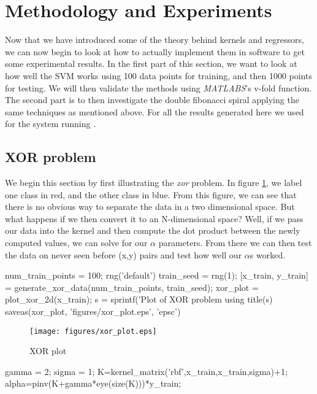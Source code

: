 \documentclass[11pt, twoside]{article}   	%
\newenvironment{matlab}{\comment}{\endcomment}
\begin{document}
\section{Methodology and Experiments}
Now that we have introduced some of the theory behind kernels and regressors, we can now begin to look at how to 
actually implement them in software to get some experimental results. 
In the first part of this section, we want to look at how well the SVM works using
100 data points for training, and then 1000 points for testing. We will
then validate the methods using \textit{MATLABS}'s v-fold function. The
second part is to then investigate the double fibonacci spiral applying
the same techniques as mentioned above. For all the results generated here
we used  for the system running
.
\subsection{XOR problem}
We begin this section by first illustrating the \textit{xor} problem. In figure 
\ref{fig:xor_plot}, we label one class in red, and the other class in blue. From 
this figure, we can see that there is no obvious way to separate the data in a
two dimensional space. But what happens if we then convert it to an N-dimensional 
space? Well, if we pass our data into the kernel and then compute the dot product
between the newly computed values, we can solve for our $\alpha$ parameters. 
From there we can then test the data on never seen before (x,y) pairs and test how 
well our $\alpha$s worked. 

\begin{matlab}
num_train_points = 100; 
rng('default') 
train_seed = rng(1); 
[x_train, y_train] = generate_xor_data(num_train_points, train_seed);
xor_plot = plot_xor_2d(x_train); 
s = sprintf('Plot of XOR problem using %
title(s)
saveas(xor_plot, 'figures/xor_plot.eps', 'epsc')
\end{matlab}

\begin{figure}[h]
\centering
\texttt{[image: figures/xor\_plot.eps]}
\caption{XOR plot}
\label{fig:xor_plot} 
\end{figure}

\FloatBarrier

\begin{matlab}
gamma = 2; 
sigma = 1; 
K=kernel_matrix('rbf',x_train,x_train,sigma)+1; 
alpha=pinv(K+gamma*eye(size(K)))*y_train;
\end{matlab}
\end{document}

